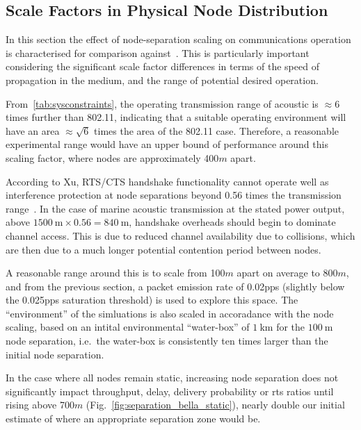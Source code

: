 \clearpage

\subsection{Scale Factors in Physical Node Distribution}

In this section the effect of node-separation scaling on communications operation is characterised for comparison against~\cite{Guo11}. 
This is particularly important considering the significant scale factor differences in terms of the speed of propagation in the medium, and the range of potential desired operation.

From~\autoref{tab:sysconstraints}, the operating transmission range of acoustic is $\approx 6$ times further than 802.11, indicating that a suitable operating environment will have an area $\approx \sqrt{6}$ times the area of the 802.11 case. Therefore, a reasonable experimental range would have an upper bound of performance around this scaling factor, where nodes are approximately 400$m$ apart. 

According to Xu, RTS/CTS handshake functionality cannot operate well as interference protection at node separations beyond 0.56 times the transmission range~\cite{Xu2002}.
In the case of marine acoustic transmission at the stated power output, above $\SI{1500}{\meter} \times 0.56 = \SI{840}{\meter}$, handshake overheads should begin to dominate channel access.
This is due to reduced channel availability due to collisions, which are then due to a much longer potential contention period between nodes. 

A reasonable range around this is to scale from 100$m$ apart on average to 800$m$, and from the previous section, a packet emission rate of 0.02pps (slightly below the 0.025pps saturation threshold) is used to explore this space.
The ``environment'' of the simluations is also scaled in accoradance with the node scaling, based on an intital environmental ``water-box'' of $\SI{1}{\kilo\meter}$ for the $\SI{100}{\meter}$ node separation, i.e.\ the water-box is consistently ten times larger than the initial node separation.

In the case where all nodes remain static, increasing node separation does not significantly impact throughput, delay, delivery probability or \gls{rts} ratios until rising above 700$m$ (Fig.~\ref{fig:separation_bella_static}), nearly double our initial estimate of where an appropriate separation zone would be.

